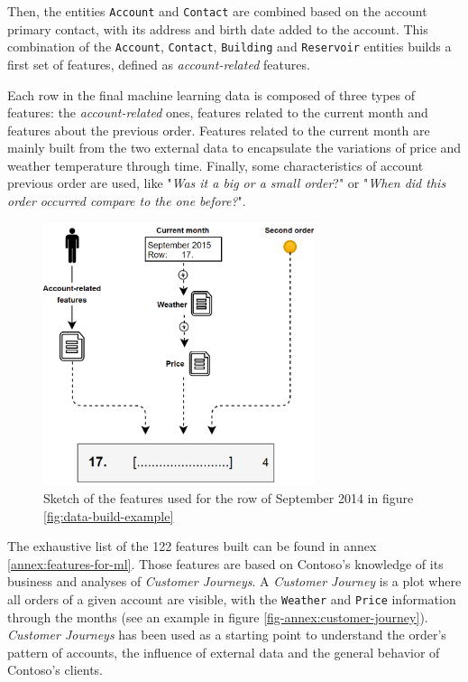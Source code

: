 Then, the entities \texttt{Account} and \texttt{Contact} are combined based on the account primary contact, with its address and birth date added to the account. This combination of the \texttt{Account}, \texttt{Contact}, \texttt{Building} and \texttt{Reservoir} entities builds a first set of features, defined as \textit{account-related} features.

Each row in the final machine learning data is composed of three types of features: the \textit{account-related} ones, features related to the current month and features about the previous order. Features related to the current month are mainly built from the two external data to encapsulate the variations of price and weather temperature through time. Finally, some characteristics of account previous order are used, like "\textit{Was it a big or a small order}?" or "\textit{When did this order occurred compare to the one before?}".


\begin{figure}[h]
    \centering
    \includegraphics[width=8cm]{images/data-build-ml-example-row.png}
    \caption[Features building for specific month]{Sketch of the features used for the row of September 2014 in figure \ref{fig:data-build-example}}
    \label{fig:data-build-row-example}
\end{figure}

The exhaustive list of the 122 features built can be found in annex \ref{annex:features-for-ml}. Those features are based on Contoso's knowledge of its business and analyses of \textit{Customer Journeys}. A \textit{Customer Journey} is a plot where all orders of a given account are visible, with the \texttt{Weather} and \texttt{Price} information through the months (see an example in figure \ref{fig-annex:customer-journey}). \textit{Customer Journeys} has been used as a starting point to understand the order's pattern of accounts, the influence of external data and the general behavior of Contoso's clients.


